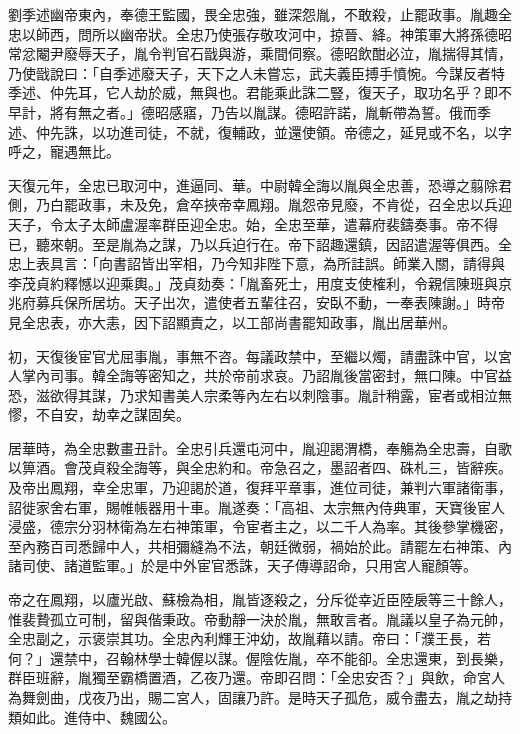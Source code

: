\begin{pinyinscope}
 劉季述幽帝東內，奉德王監國，畏全忠強，雖深怨胤，不敢殺，止罷政事。胤趣全忠以師西，問所以幽帝狀。全忠乃使張存敬攻河中，掠晉、絳。神策軍大將孫德昭常忿閹尹廢辱天子，胤令判官石戩與游，乘間伺察。德昭飲酣必泣，胤揣得其情，乃使戩說曰：「自季述廢天子，天下之人未嘗忘，武夫義臣搏手憤惋。今謀反者特季述、仲先耳，它人劫於威，無與也。君能乘此誅二豎，復天子，取功名乎？即不早計，將有無之者。」德昭感寤，乃告以胤謀。德昭許諾，胤斬帶為誓。俄而季述、仲先誅，以功進司徒，不就，復輔政，並還使領。帝德之，延見或不名，以字呼之，寵遇無比。



 天復元年，全忠已取河中，進逼同、華。中尉韓全誨以胤與全忠善，恐導之翦除君側，乃白罷政事，未及免，倉卒挾帝幸鳳翔。胤怨帝見廢，不肯從，召全忠以兵迎天子，令太子太師盧渥率群臣迎全忠。始，全忠至華，遣幕府裴鑄奏事。帝不得已，聽來朝。至是胤為之謀，乃以兵迫行在。帝下詔趣還鎮，因詔遣渥等俱西。全忠上表具言：「向書詔皆出宰相，乃今知非陛下意，為所詿誤。師業入關，請得與李茂貞約釋憾以迎乘輿。」茂貞劾奏：「胤畜死士，用度支使榷利，令親信陳班與京兆府募兵保所居坊。天子出次，遣使者五輩往召，安臥不動，一奉表陳謝。」時帝見全忠表，亦大恚，因下詔顯責之，以工部尚書罷知政事，胤出居華州。



 初，天復後宦官尤屈事胤，事無不咨。每議政禁中，至繼以燭，請盡誅中官，以宮人掌內司事。韓全誨等密知之，共於帝前求哀。乃詔胤後當密封，無口陳。中官益恐，滋欲得其謀，乃求知書美人宗柔等內左右以刺陰事。胤計稍露，宦者或相泣無憀，不自安，劫幸之謀固矣。



 居華時，為全忠數畫丑計。全忠引兵還屯河中，胤迎謁渭橋，奉觴為全忠壽，自歌以箅酒。會茂貞殺全誨等，與全忠約和。帝急召之，墨詔者四、硃札三，皆辭疾。及帝出鳳翔，幸全忠軍，乃迎謁於道，復拜平章事，進位司徒，兼判六軍諸衛事，詔徙家舍右軍，賜帷帳器用十車。胤遂奏：「高祖、太宗無內侍典軍，天寶後宦人浸盛，德宗分羽林衛為左右神策軍，令宦者主之，以二千人為率。其後參掌機密，至內務百司悉歸中人，共相彌縫為不法，朝廷微弱，禍始於此。請罷左右神策、內諸司使、諸道監軍。」於是中外宦官悉誅，天子傳導詔命，只用宮人寵顏等。



 帝之在鳳翔，以廬光啟、蘇檢為相，胤皆逐殺之，分斥從幸近臣陸扆等三十餘人，惟裴贄孤立可制，留與偕秉政。帝動靜一決於胤，無敢言者。胤議以皇子為元帥，全忠副之，示褒崇其功。全忠內利輝王沖幼，故胤藉以請。帝曰：「濮王長，若何？」還禁中，召翰林學士韓偓以謀。偓陰佐胤，卒不能卻。全忠還東，到長樂，群臣班辭，胤獨至霸橋置酒，乙夜乃還。帝即召問：「全忠安否？」與飲，命宮人為舞劍曲，戊夜乃出，賜二宮人，固讓乃許。是時天子孤危，威令盡去，胤之劫持類如此。進侍中、魏國公。




\end{pinyinscope}

